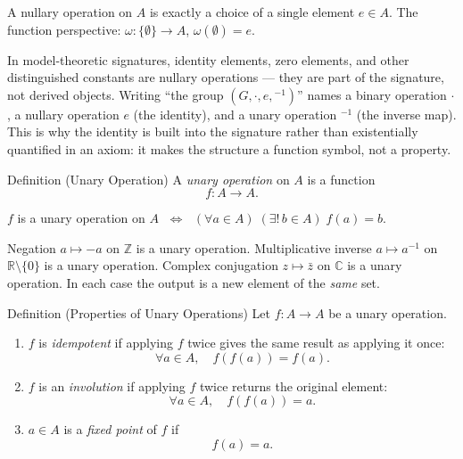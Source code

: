 \begin{remark}
A nullary operation on $A$ is exactly a choice of a single element
$e \in A$.
The function perspective: $\omega : \{\emptyset\} \to A$,
$\omega(\emptyset) = e$.
\end{remark}

\begin{remark}
In model-theoretic signatures, identity elements, zero elements, and
other distinguished constants are nullary operations — they are part of the
signature, not derived objects.
Writing ``the group $(G, \cdot, e, {}^{-1})$'' names a binary operation
$\cdot$, a nullary operation $e$ (the identity), and a unary operation
${}^{-1}$ (the inverse map).
This is why the identity is built into the signature rather than
existentially quantified in an axiom: it makes the structure a function
symbol, not a property.
\end{remark}


\begin{definitionbox}{Definition (Unary Operation)}
\label{def:unary-op}
A \emph{unary operation} on $A$ is a function
\[
  f : A \to A.
\]
\end{definitionbox}

\begin{remark}
$f$ is a unary operation on $A$
$\;\iff\;$
$(\forall a \in A)\;(\exists!\, b \in A)\; f(a) = b$.
\end{remark}

\begin{remark}[Examples]
Negation $a \mapsto -a$ on $\mathbb{Z}$ is a unary operation.
Multiplicative inverse $a \mapsto a^{-1}$ on $\mathbb{R} \setminus \{0\}$
is a unary operation.
Complex conjugation $z \mapsto \bar{z}$ on $\mathbb{C}$ is a unary operation.
In each case the output is a new element of the \emph{same} set.
\end{remark}

\begin{definitionbox}{Definition (Properties of Unary Operations)}
\label{def:unary-laws}
Let $f : A \to A$ be a unary operation.
\begin{enumerate}[label=(\roman*)]
  \item $f$ is \emph{idempotent} if applying $f$ twice gives the same
        result as applying it once:
        \[
          \forall a \in A,\quad f(f(a)) = f(a).
        \]
  \item $f$ is an \emph{involution} if applying $f$ twice returns the
        original element:
        \[
          \forall a \in A,\quad f(f(a)) = a.
        \]
  \item $a \in A$ is a \emph{fixed point} of $f$ if
        \[
          f(a) = a.
        \]
\end{enumerate}
\end{definitionbox}

